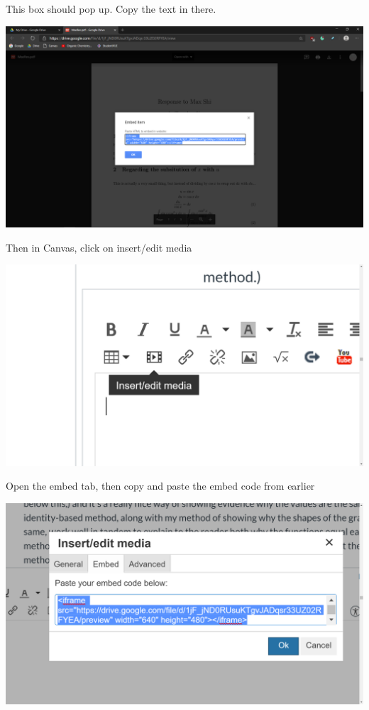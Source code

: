 \documentclass[letterpaper, 12pt]{article}
\begin{document}
This box should pop up. Copy the text in there.
\begin{center}
    \includegraphics[scale=0.3]{5.png}
\end{center}
Then in Canvas, click on insert/edit media
\begin{center}
    \includegraphics[scale=0.3]{6.png}
\end{center}
Open the embed tab, then copy and paste the embed code from earlier
\begin{center}
    \includegraphics[scale=0.3]{7.png}
\end{center}
\end{document}
